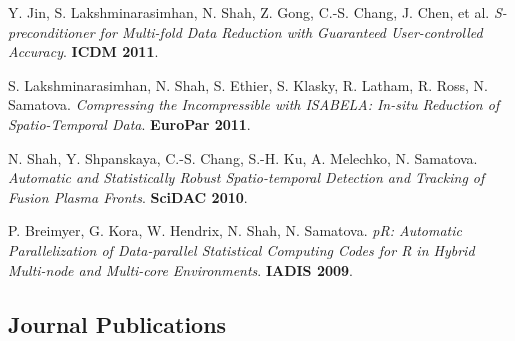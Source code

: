 \documentclass{article}
\begin{document}
\begin{etaremune}[itemsep=1pt,parsep=0pt]
\item Y. Jin, S. Lakshminarasimhan, N. Shah, Z. Gong, C.-S. Chang, J. Chen, et al. \emph{S-preconditioner for Multi-fold Data Reduction with Guaranteed User-controlled Accuracy}. \textbf{ICDM 2011}.
\item S. Lakshminarasimhan, N. Shah, S. Ethier, S. Klasky, R. Latham, R. Ross, N. Samatova. \emph{Compressing the Incompressible with ISABELA: In-situ Reduction of Spatio-Temporal Data}. \textbf{EuroPar 2011}.
\item N. Shah, Y. Shpanskaya, C.-S. Chang, S.-H. Ku, A. Melechko, N. Samatova. \emph{Automatic and Statistically Robust Spatio-temporal Detection and Tracking of Fusion Plasma Fronts}. \textbf{SciDAC 2010}.
\item P. Breimyer, G. Kora, W. Hendrix, N. Shah, N. Samatova. \emph{pR: Automatic Parallelization of Data-parallel Statistical Computing Codes for R in Hybrid Multi-node and Multi-core Environments}. \textbf{IADIS 2009}.
\end{etaremune}

\subsection*{\bf {Journal Publications}}
\end{document}
